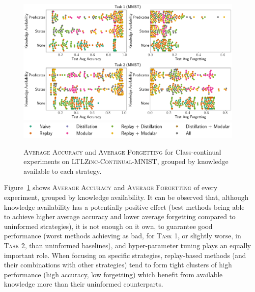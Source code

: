 \begin{figure}
	\centering
	\begin{minipage}{\linewidth}
		\includegraphics[width=\textwidth]{imgs/ltlzinc/swarm_mnist.pdf}\\
		\includegraphics[width=\textwidth]{imgs/ltlzinc/swarm_legend.pdf}
	\end{minipage}
	\caption[\textsc{Average Accuracy} and \textsc{Average Forgetting} on \textsc{LTLZinc-Continual-MNIST}]{\textsc{Average Accuracy} and \textsc{Average Forgetting} for Class-continual experiments on \textsc{LTLZinc-Continual-MNIST}, grouped by knowledge available to each strategy.}
	\label{ltlzinc:fig:swarm-mnist}
\end{figure}
%
Figure~\ref{ltlzinc:fig:swarm-mnist} shows \textsc{Average Accuracy} and \textsc{Average Forgetting} of every experiment, grouped by knowledge availability. It can be observed that, although knowledge availability has a potentially positive effect (best methods being able to achieve higher average accuracy and lower average forgetting compared to uninformed strategies), it is not enough on it own, to guarantee good performance (worst methods achieving as bad, for \textsc{Task 1}, or slightly worse, in \textsc{Task 2}, than uninformed baselines), and hyper-parameter tuning plays an equally important role.
When focusing on specific strategies, replay-based methods (and their combinations with other strategies) tend to form tight clusters of high performance (high accuracy, low forgetting) which benefit from available knowledge more than their uninformed counterparts.

